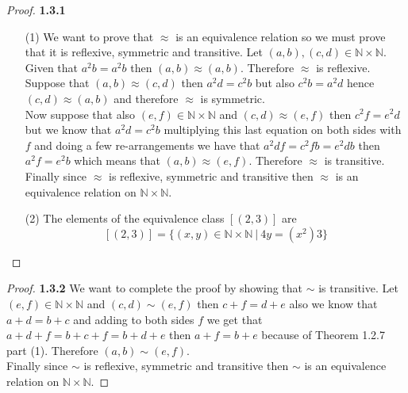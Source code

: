 \documentclass[11pt]{article}
\newcommand{\N}{\mathbb{N}}
\theoremstyle{definition}
\begin{document}
    \begin{proof}{\textbf{1.3.1}}
        \begin{itemize}
            \item [(1)] We want to prove that $\approx$ is an equivalence relation so we
            must prove that it is reflexive, symmetric and transitive. Let
            $(a,b),(c,d) \in \N \times \N$. Given that $a^2b=a^2b$ then
            $(a,b) \approx (a,b)$. Therefore $\approx$ is reflexive. \\
            Suppose that $(a,b) \approx (c,d)$ then $a^2d=c^2b$ but also $c^2b=a^2d$
            hence $(c,d) \approx (a,b)$ and therefore $\approx$ is symmetric. \\
            Now suppose that also $(e,f) \in \N \times \N$ and $(c,d) \approx (e,f)$ 
            then $c^2f = e^2d$ but we know that $a^2d=c^2b$ multiplying this last
            equation on both sides with $f$ and doing a few re-arrangements we have that
            $a^2df = c^2fb = e^2db$ then $a^2f=e^2b$ which means that
            $(a,b) \approx (e,f)$. Therefore $\approx$ is transitive.\\
            Finally since $\approx$ is reflexive, symmetric and transitive then
            $\approx$ is an equivalence relation on $\N \times \N$.
            \item [(2)] The elements of the equivalence class $[(2,3)]$ are
            $$[(2,3)] = \{(x,y)\in\N\times\N~|~ 4y = (x^2)3\}$$
        \end{itemize}
    \end{proof}
    \begin{proof}{\textbf{1.3.2}}
            We want to complete the proof by showing that $\sim$ is transitive. Let
            $(e,f) \in \N \times \N$ and $(c,d) \sim (e,f)$ then $c+f = d+e$ also we
            know that $a+d = b+c$ and adding to both sides $f$ we get that
            $a+d+f = b+c+f = b+d+e$ then $a+f = b+e$ because of Theorem 1.2.7 part (1).
            Therefore $(a,b)\sim(e,f)$.\\
            Finally since $\sim$ is reflexive, symmetric and transitive then
            $\sim$ is an equivalence relation on $\N \times \N$.
    \end{proof}
\end{document}
